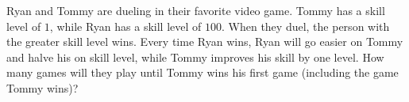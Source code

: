 Ryan and Tommy are dueling in their favorite video game. Tommy has a skill level of $1$, while Ryan has a skill level of $100$. When they duel, the person with the greater skill level wins. Every time Ryan wins, Ryan will go easier on Tommy and halve his on skill level, while Tommy improves his skill by one level. How many games will they play until Tommy wins his first game (including the game Tommy wins)?
